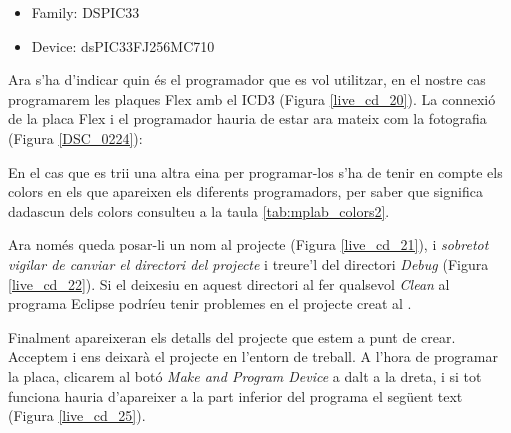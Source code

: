 \begin{itemize}
	\item Family: DSPIC33
	\item Device: dsPIC33FJ256MC710
\end{itemize}


Ara s'ha d'indicar quin és el programador que es vol utilitzar, en el nostre cas programarem les plaques Flex amb el ICD3 (Figura \ref{live_cd_20}).
La connexió de la placa Flex i el programador hauria de estar ara mateix com la fotografia (Figura \ref{DSC_0224}):


En el cas que es trii una altra eina per programar-los s'ha de tenir en compte els colors en els que apareixen els diferents programadors, per saber que significa dadascun dels colors consulteu a la taula \ref{tab:mplab_colors2}.



\clearpage

Ara només queda posar-li un nom al projecte (Figura \ref{live_cd_21}), i \emph{sobretot vigilar de canviar el directori del projecte} i treure'l del directori \emph{Debug} (Figura \ref{live_cd_22}). Si el deixesiu en aquest directori al fer qualsevol \emph{Clean} al programa Eclipse podríeu tenir problemes en el projecte creat al \MplabX.




Finalment apareixeran els detalls del projecte que estem a punt de crear.
Acceptem i ens deixarà el projecte en l'entorn de treball.
A l'hora de programar la placa, clicarem al botó \emph{Make and Program Device} a dalt a la dreta, i si tot funciona hauria d'apareixer a la part inferior del programa el següent text (Figura \ref {live_cd_25}).


\clearpage

